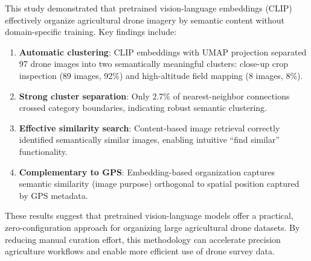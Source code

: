 
This study demonstrated that pretrained vision-language embeddings (CLIP) effectively organize agricultural drone imagery by semantic content without domain-specific training. Key findings include:

\begin{enumerate}
    \item \textbf{Automatic clustering}: CLIP embeddings with UMAP projection separated 97 drone images into two semantically meaningful clusters: close-up crop inspection (89 images, 92\%) and high-altitude field mapping (8 images, 8\%).

    \item \textbf{Strong cluster separation}: Only 2.7\% of nearest-neighbor connections crossed category boundaries, indicating robust semantic clustering.

    \item \textbf{Effective similarity search}: Content-based image retrieval correctly identified semantically similar images, enabling intuitive ``find similar'' functionality.

    \item \textbf{Complementary to GPS}: Embedding-based organization captures semantic similarity (image purpose) orthogonal to spatial position captured by GPS metadata.
\end{enumerate}

These results suggest that pretrained vision-language models offer a practical, zero-configuration approach for organizing large agricultural drone datasets. By reducing manual curation effort, this methodology can accelerate precision agriculture workflows and enable more efficient use of drone survey data.

